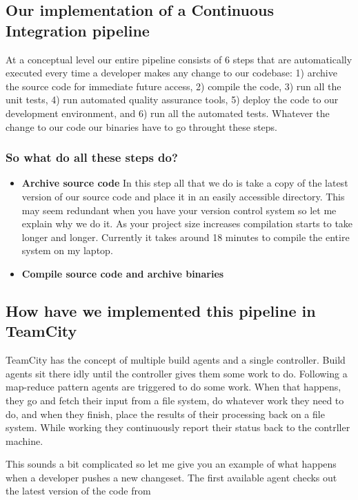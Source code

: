 \documentclass{article}
\begin{document}
\subsection{Our implementation of a Continuous Integration pipeline}

At a conceptual level our entire pipeline consists of 6 steps that are
automatically executed every time a developer makes any change to our
codebase: 1) archive the source code for immediate future access, 2)
compile the code, 3) run all the unit tests, 4) run automated quality
assurance tools, 5) deploy the code to our development environment,
and 6) run all the automated tests.
%
Whatever the change to our code our binaries have to go throught these
steps.

\subsubsection*{So what do all these steps do?}
\begin{itemize}
  \item \textbf{Archive source code} 
%
In this step all that we do is take a copy of the latest version of
our source code and place it in an easily accessible directory.
%
This may seem redundant when you have your version control system so
let me explain why we do it.
%
As your project size increases compilation starts to take longer and
longer.
%
Currently it takes around 18 minutes to compile the entire system on
my laptop.

  \item \textbf{Compile source code and archive binaries}
%

\end{itemize}

\subsection{How have we implemented this pipeline in TeamCity}
TeamCity has the concept of multiple build agents and a single
controller.
%
Build agents sit there idly until the controller gives them some work
to do.
%
Following a map-reduce pattern agents are triggered to do some work.
%
When that happens, they go and fetch their input from a file system,
do whatever work they need to do, and when they finish, place the
results of their processing back on a file system.
%
While working they continuously report their status back to the
contrller machine.

This sounds a bit complicated so let me give you an example of what
happens when a developer pushes a new changeset.
%
The first available agent checks out the latest version of the code
from 
\end{document}
